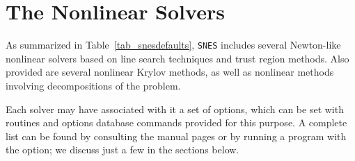 \section{The Nonlinear Solvers}
\label{sec_nlsolvers}

As summarized in Table~\ref{tab_snesdefaults}, \lstinline{SNES} includes several Newton-like nonlinear solvers based on line search
techniques and trust region methods.  Also provided are several nonlinear Krylov methods, as well as nonlinear
methods involving decompositions of the problem.

Each solver may have associated with it a set of options, which can be
set with routines and options database commands provided for this
purpose.  A complete list can be found by consulting the manual pages
or by running a program with the  option; we discuss just a
few in the sections below.

